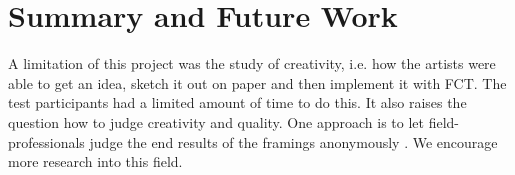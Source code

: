 \section{Summary and Future Work}


A limitation of this project was the study of creativity, i.e. how the artists were able to get an idea, sketch it out on paper and then implement it with FCT. The test participants had a limited amount of time to do this. It also raises the question how to judge creativity and quality. One approach is to let field-professionals judge the end results of the framings anonymously \cite{sadeghi_artist_2010}. We encourage more research into this field.